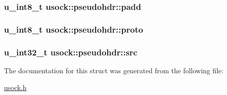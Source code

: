 \hypertarget{structusock_1_1pseudohdr_470b0a2144a312e42d1898e45a8308d7}{
\subsubsection[{padd}]{\setlength{\rightskip}{0pt plus 5cm}u\_\-int8\_\-t {\bf usock::pseudohdr::padd}}}
\label{structusock_1_1pseudohdr_470b0a2144a312e42d1898e45a8308d7}


\hypertarget{structusock_1_1pseudohdr_9e3ab245b7abacec2c0eb35558f647c3}{
\subsubsection[{proto}]{\setlength{\rightskip}{0pt plus 5cm}u\_\-int8\_\-t {\bf usock::pseudohdr::proto}}}
\label{structusock_1_1pseudohdr_9e3ab245b7abacec2c0eb35558f647c3}


\hypertarget{structusock_1_1pseudohdr_4591b2ea737abb3f7745638de1e22a03}{
\subsubsection[{src}]{\setlength{\rightskip}{0pt plus 5cm}u\_\-int32\_\-t {\bf usock::pseudohdr::src}}}
\label{structusock_1_1pseudohdr_4591b2ea737abb3f7745638de1e22a03}




The documentation for this struct was generated from the following file:\begin{CompactItemize}
\item 
\hyperlink{usock_8h}{usock.h}\end{CompactItemize}
